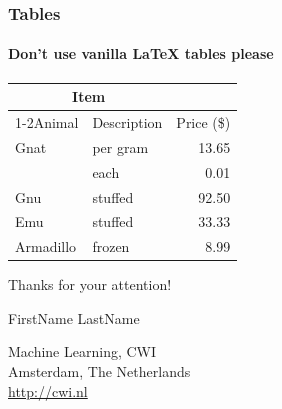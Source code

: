\documentclass[12pt,aspectratio=169]{beamer}
\begin{document}
\begin{frame}

	\frametitle{Tables}
	\framesubtitle{Don't use vanilla \LaTeX{}  tables please}
	
		\begin{center}
			\begin{tabular}{@{}llr@{}}
				\toprule\multicolumn{2}{c}{Item} \\
				\cmidrule(r){1-2}Animal & Description & Price (\$)\\
				\midrule
				Gnat  & per gram  & 13.65 \\
				& each      & 0.01 \\
				Gnu   & stuffed   & 92.50 \\
				Emu   & stuffed   & 33.33 \\
				Armadillo & frozen & 8.99 \\
				\bottomrule
			\end{tabular}
		\end{center}

\end{frame}

\begin{closingframe}{Thanks for your attention!}

FirstName LastName\\

\medskip

Machine Learning, CWI\\
Amsterdam, The Netherlands\\
\url{http://cwi.nl}

\end{closingframe}
\end{document}
